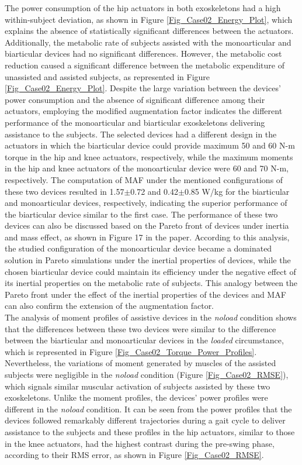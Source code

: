 \documentclass[10pt,letterpaper]{article}
\begin{document}
The power consumption of the hip actuators in both exoskeletons had a high within-subject deviation, as shown in Figure \ref{Fig_Case02_Energy_Plot}, which explains the absence of statistically significant differences between the actuators.  Additionally, the metabolic rate of subjects assisted with the monoarticular and biarticular devices had no significant differences. However, the metabolic cost reduction caused a significant difference between the metabolic expenditure of unassisted and assisted subjects, as represented in Figure \ref{Fig_Case02_Energy_Plot}.
Despite the large variation between the devices' power consumption and the absence of significant difference among their actuators, employing the modified augmentation factor indicates the different performance of the monoarticular and biarticular exoskeletons delivering assistance to the subjects. The selected devices had a different design in the actuators in which the biarticular device could provide maximum 50 and 60 N-m torque in the hip and knee actuators, respectively, while the maximum moments in the hip and knee actuators of the monoarticular device were 60 and 70 N-m, respectively. The computation of MAF under the mentioned configurations of these two devices resulted in 1.57$\pm$0.72 and 0.42$\pm$0.85 W/kg for the biarticular and monoarticular devices, respectively, indicating the superior performance of the biarticular device similar to the first case. The performance of these two devices can also be discussed based on the Pareto front of devices under inertia and mass effect, as shown in Figure 17 in the paper. According to this analysis, the studied configuration of the monoarticular device became a dominated solution in Pareto simulations under the inertial properties of devices, while the chosen biarticular device could maintain its efficiency under the negative effect of its inertial properties on the metabolic rate of subjects. This analogy between the Pareto front under the effect of the inertial properties of the devices and MAF can also confirm the extension of the augmentation factor.\\
The analysis of moment profiles of assistive devices in the {\it noload} condition shows that the differences between these two devices were similar to the difference between the biarticular and monoarticular devices in the {\it loaded} circumstance, which is represented in Figure \ref{Fig_Case02_Torque_Power_Profiles}. Nevertheless, the variations of moment generated by muscles of the assisted subjects were negligible in the {\it noload} condition (Figure \ref{Fig_Case02_RMSE}), which signals similar muscular activation of subjects assisted by these two exoskeletons. Unlike the moment profiles, the devices' power profiles were different in the {\it noload} condition. It can be seen from the power profiles that the devices followed remarkably different trajectories during a gait cycle to deliver assistance to the subjects and these profiles in the hip actuators, similar to those in the knee actuators, had the highest contrast during the pre-swing phase, according to their RMS error, as shown in Figure \ref{Fig_Case02_RMSE}.\\
\end{document}
